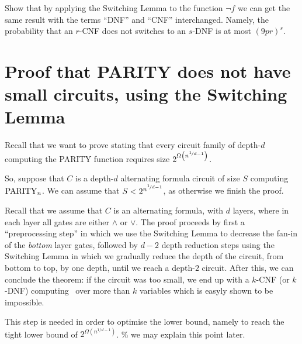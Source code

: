 \begin{exercise} Show that by applying the Switching Lemma to the function $\neg f$ we can get the same result with the terms ``DNF'' and ``CNF'' interchanged. Namely, the probability that an $r$-CNF does not switches to an $s$-DNF is at most $(9pr)^s$.
\end{exercise}

\section{Proof that PARITY does not have small circuits, using the Switching Lemma}

Recall that we want to prove   stating that every circuit family of depth-$d$ computing the PARITY function requires size $2^{\Omega\left(n^{\nicefrac{1}{d-1}}\right)}$.

So, suppose  that $C$ is a depth-$d$ alternating formula circuit of size $S$ computing $\operatorname{PARITY}_n$. We can assume that 
$S< 2^{ n^{\nicefrac{1}{d-1}}}$, as otherwise we finish the proof.


Recall that we assume that $C$ is an alternating formula, with $d$ layers, where in each layer all gates are either $\land$ or $\lor$.  The proof proceeds by first a ``preprocessing step'' in which we use the Switching Lemma to decrease the fan-in of the \emph{bottom} layer gates, followed by   $d-2$ depth reduction steps using the Switching Lemma in which we gradually reduce the depth of the circuit, from bottom to top, by one depth, until we reach a depth-$2$ circuit.
After this, we can conclude the theorem: if the circuit was too small, we end up with a $k$-CNF (or $k$-DNF) computing \Parity\ over more than $k$ variables which is easyly shown to be impossible.








This step is needed in order to optimise the lower bound, namely to reach the tight lower bound of $2^{\Omega(n^{1/d-1})}$. \% we may explain this point later.

